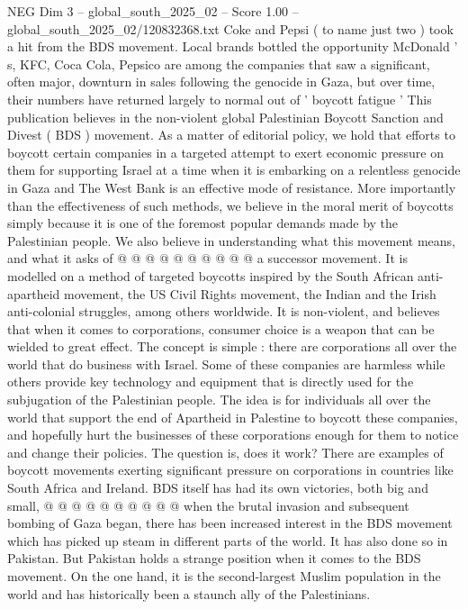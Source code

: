 \begin{textsample}{NEG Dim 3 – global\_south\_2025\_02 – Score 1.00 – global\_south\_2025\_02/120832368.txt}  \label{ex:f3_neg_050}
Coke and Pepsi ( to name just two ) took a hit from the BDS movement.
Local brands bottled the opportunity McDonald ' s, KFC, Coca Cola, Pepsico are among the companies that saw a significant, often major, downturn in sales following the genocide in Gaza, but over time, their numbers have returned largely to normal out of ' boycott fatigue ' This publication believes in the non-violent global Palestinian Boycott Sanction and Divest ( BDS ) movement.
As a matter of editorial policy, we hold that efforts to boycott certain companies in a targeted attempt to exert economic pressure on them for supporting Israel at a time when it is embarking on a relentless genocide in Gaza and The West Bank is an effective mode of resistance.
More importantly than the effectiveness of such methods, we believe in the moral merit of boycotts simply because it is one of the foremost popular demands made by the Palestinian people.
We also believe in understanding what this movement means, and what it asks of @ @ @ @ @ @ @ @ @ @ a successor movement.
It is modelled on a method of targeted boycotts inspired by the South African anti-apartheid movement, the US Civil Rights movement, the Indian and the Irish anti-colonial struggles, among others worldwide.
It is non-violent, and believes that when it comes to corporations, consumer choice is a weapon that can be wielded to great effect.
The concept is simple : there are corporations all over the world that do business with Israel.
Some of these companies are harmless while others provide key technology and equipment that is directly used for the subjugation of the Palestinian people.
The idea is for individuals all over the world that support the end of Apartheid in Palestine to boycott these companies, and hopefully hurt the businesses of these corporations enough for them to notice and change their policies.
The question is, does it work?
There are examples of boycott movements exerting significant pressure on corporations in countries like South Africa and Ireland.
BDS itself has had its own victories, both big and small, @ @ @ @ @ @ @ @ @ @ when the brutal invasion and subsequent bombing of Gaza began, there has been increased interest in the BDS movement which has picked up steam in different parts of the world.
It has also done so in Pakistan.
But Pakistan holds a strange position when it comes to the BDS movement.
On the one hand, it is the second-largest Muslim population in the world and has historically been a staunch ally of the Palestinians.

\end{textsample}
